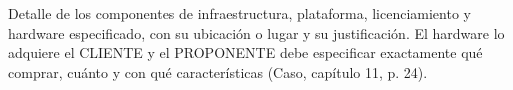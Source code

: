 %
%
%

  {Detalle de los componentes de infraestructura, plataforma, licenciamiento
   y hardware especificado, con su ubicación o lugar y su justificación. El
   hardware lo adquiere el CLIENTE y el PROPONENTE debe especificar
   exactamente qué comprar, cuánto y con qué características
   (Caso, capítulo 11, p. 24).}

\newcommand\entradaIndiceComponente[2]{%
  \ifdefined\FormularioActual\phantomsection\addcontentsline{toc}{subsection}{Componente #1. #2}\fi}
\newcommand\componenteTOnce[1]{\RegistroNuevo{t11}{#1}}

